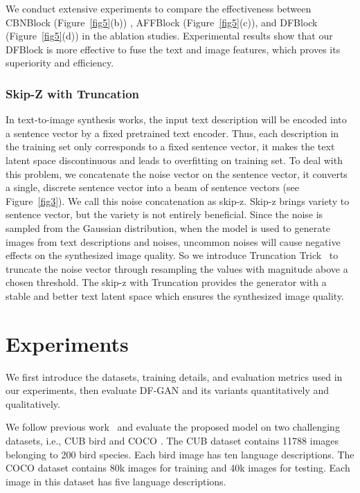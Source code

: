 \documentclass[10pt,twocolumn,letterpaper]{article}
\begin{document}
We conduct extensive experiments to compare the effectiveness between CBNBlock (Figure~\ref{fig5}(b)) \cite{miyato2018cgans}, AFFBlock (Figure~\ref{fig5}(c)), and DFBlock (Figure~\ref{fig5}(d)) in the ablation studies. 
Experimental results show that our DFBlock is more effective to fuse the text and image features, which proves its superiority and efficiency.

\subsubsection{Skip-Z with Truncation}

In text-to-image synthesis works, the input text description will be encoded into a sentence vector by a fixed pretrained text encoder.
Thus, each description in the training set only corresponds to a fixed sentence vector, it makes the text latent space discontinuous and leads to overfitting on training set.
To deal with this problem, we concatenate the noise vector on the sentence vector, it converts a single, discrete sentence vector into a beam of sentence vectors (see Figure~\ref{fig3}).
We call this noise concatenation as skip-z.
Skip-z brings variety to sentence vector, but the variety is not entirely beneficial. 
Since the noise is sampled from the Gaussian distribution, when the model is used to generate images from text descriptions and noises, uncommon noises will cause negative effects on the synthesized image quality.
So we introduce Truncation Trick~\cite{brock2018large,karras2019style} to truncate the noise vector through resampling the values with magnitude above a chosen threshold.
The skip-z with Truncation provides the generator with a stable and better text latent space which ensures the synthesized image quality.

\section{Experiments}
We first introduce the datasets, training details, and evaluation metrics used in our experiments, then evaluate DF-GAN and its variants quantitatively and qualitatively. 

 We follow previous work~\cite{zhang2017stackgan,zhang2018stackgan,xu2018attngan,zhu2019dm,yin2019semantics,qiao2019mirrorgan} and evaluate the proposed model on two challenging datasets, i.e., CUB bird \cite{wah2011caltech} and COCO \cite{lin2014microsoft}.
The CUB dataset contains 11788 images belonging to 200 bird species. Each bird image has ten language descriptions. 
The COCO dataset contains 80k images for training and 40k images for testing. Each image in this dataset has five language descriptions. 
\end{document}
